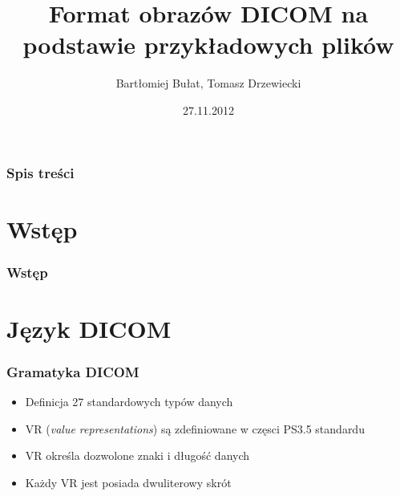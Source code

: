 \documentclass{beamer}
\title[DICOM]{Format obrazów DICOM na podstawie przykładowych plików}
\author[B. Bułat, T. Drzewiecki]{Bartłomiej Bułat, Tomasz Drzewiecki}
\date[2012]{27.11.2012}
\institute[AGH]
{Wydział EAIiIB\\ 
Katedra Automatyki
}
\begin{document}
{
 \begin{frame}
   \titlepage
 \end{frame}
}


\begin{frame}
  \frametitle{Spis treści}
  \tableofcontents
\end{frame}

\newcommand{\nextoc}{ \begin{frame}\frametitle{Spis treści}\tableofcontents[hidesubsections]\end{frame}}


\section{Wstęp}
\begin{frame}
    \frametitle{Wstęp}

\end{frame}

\section{Język DICOM}
\begin{frame}
    \frametitle{Gramatyka DICOM}
\begin{itemize}
  \item Definicja 27 standardowych typów danych
  \item VR (\emph{value representations}) są zdefiniowane w częsci PS3.5 standardu
  \item VR określa dozwolone znaki i długość danych
  \item Każdy VR jest posiada dwuliterowy skrót
\end{itemize}
\end{frame}
\end{document}
